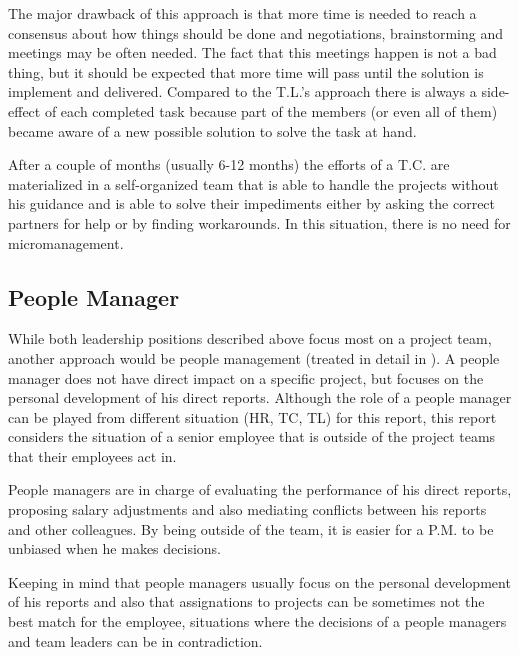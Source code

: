 The major drawback of this approach is that more time is needed to reach a consensus about how things should be done and negotiations, brainstorming and meetings may be often needed. The fact that this meetings happen is not a bad thing, but it should be expected that more time will pass until the solution is implement and delivered. Compared to the T.L.'s approach there is always a side-effect of each completed task because part of the members (or even all of them) became aware of a new possible solution to solve the task at hand. 

After a couple of months (usually 6-12 months) the efforts of a T.C. are materialized in a self-organized team that is able to handle the projects without his guidance and is able to solve their impediments either by asking the correct partners for help or by finding workarounds. In this situation, there is no need for micromanagement.

\subsection{People Manager}
\label{sub-sec:pm}
While both leadership positions described above focus most on a project team, another approach would be people management (treated in detail in \cite{abur-pm}). A people manager does not have direct impact on a specific project, but focuses on the personal development of his direct reports. Although the role of a people manager can be played from different situation (HR, TC, TL) for this report, this report considers the situation of a senior employee that is outside of the project teams that their employees act in. 

People managers are in charge of evaluating the performance of his direct reports, proposing salary adjustments and also mediating conflicts between his reports and other colleagues. By being outside of the team, it is easier for a P.M. to be unbiased when he makes decisions.

Keeping in mind that people managers usually focus on the personal development of his reports and also that assignations to projects can be sometimes not the best match for the employee, situations where the decisions of a people managers and team leaders can be in contradiction. 

